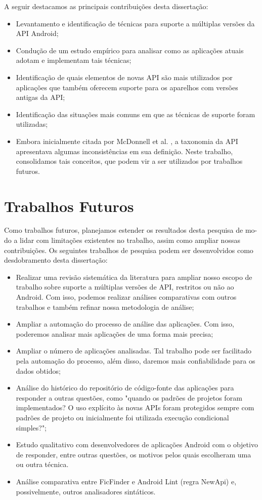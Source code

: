 A seguir destacamos as principais contribuições desta dissertação:
\begin{itemize}
	\item Levantamento e identificação de técnicas para suporte a múltiplas versões
		da API Android;
	\item Condução de um estudo empírico para analisar como as aplicações atuais
		adotam e implementam tais técnicas;
	\item Identificação de quais elementos de novas API são mais utilizados por
		aplicações que também oferecem suporte para os aparelhos com versões antigas
		da API;
	\item Identificação das situações mais comuns em que as técnicas de suporte
		foram utilizadas;
	\item Embora inicialmente citada por McDonnell et al. \cite{McDonnell2013},
		a taxonomia da API apresentava algumas inconsistências em sua definição.
		Neste trabalho, consolidamos tais conceitos, que podem vir a ser utilizados
		por trabalhos futuros.
\end{itemize}

\section{Trabalhos Futuros}\label{sec:trabalhos_futuros}

Como trabalhos futuros, planejamos estender os resultados desta pesquisa
de mo- do a lidar com limitações existentes no trabalho, assim como ampliar 
nossas contribuições. Os seguintes trabalhos de pesquisa podem ser desenvolvidos
como desdobramento desta dissertação:

\begin{itemize}
	\item Realizar uma revisão sistemática da literatura para ampliar nosso
		escopo de trabalho sobre suporte a múltiplas versões de API, restritos
		ou não ao Android. Com isso, podemos realizar análises comparativas com
		outros trabalhos e também refinar nossa metodologia de análise;
	\item Ampliar a automação do processo de análise das aplicações. Com isso,
		poderemos analisar mais aplicações de uma forma mais precisa;
	\item Ampliar o número de aplicações analisadas. Tal trabalho pode ser facilitado
		pela automação do processo, além disso, daremos mais confiabilidade para os
		dados obtidos;
	\item Análise do histórico do repositório de código-fonte das aplicações para
		responder a outras questões, como "quando os padrões de projetos foram
		implementados? O uso explícito às novas APIs foram protegidos sempre com
		padrões de projeto ou inicialmente foi utilizada execução condicional simples?"; 
	\item Estudo qualitativo com desenvolvedores de aplicações Android com o objetivo
		de responder, entre outras questões, os motivos pelos quais escolheram uma ou
		outra técnica.
	\item Análise comparativa entre FicFinder e Android Lint (regra NewApi) e,
		possivelmente, outros analisadores sintáticos.
\end{itemize}
